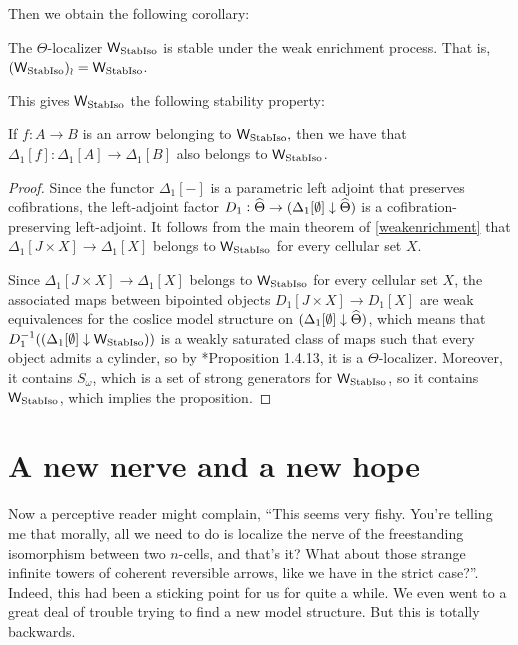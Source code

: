 Then we obtain the following corollary:
\begin{cor} The \(\Theta\)-localizer \(\mathsf{W}_{\operatorname{StabIso}}\) is stable under the weak enrichment process.  That is, \((\mathsf{W}_{\operatorname{StabIso}})_\wr=\mathsf{W}_{\operatorname{StabIso}}\).
\end{cor}
This gives \(\mathsf{W}_{\operatorname{StabIso}}\) the following stability property:
\begin{prop}If \(f:A\to B\) is an arrow belonging to \(\mathsf{W}_{\operatorname{StabIso}},\) then we have that \(\Delta_1[f]:\Delta_1[A]\to \Delta_1[B]\) also belongs to \(\mathsf{W}_{\operatorname{StabIso}}\).  
\end{prop}
\begin{proof}Since the functor \(\Delta_1[-]\) is a parametric left adjoint that preserves cofibrations, the left-adjoint factor \(D_1:\widehat{\Theta} \to {(\Delta_1[\emptyset]\downarrow \ensuremath{\widehat{\Theta}})}\) is a cofibration-preserving left-adjoint.  It follows from the main theorem of \eqref{weakenrichment} that \(\Delta_1[J\times X] \to \Delta_1[X]\) belongs to \(\mathsf{W}_{\operatorname{StabIso}}\) for every cellular set \(X\).

Since \(\Delta_1[J\times X]\to \Delta_1[X]\) belongs to \(\mathsf{W}_{\operatorname{StabIso}}\) for every cellular set \(X\), the associated maps between bipointed objects \(D_1[J\times X]\to D_1[X]\) are weak equivalences for the coslice model structure on \({(\Delta_1[\emptyset]\downarrow \widehat{\Theta})}\), which means that \(D_1^{-1}({(\Delta_1[\emptyset]\downarrow \mathsf{W}_{\operatorname{StabIso}})})\) is a weakly saturated class of maps such that every object admits a cylinder, so by \cite{cisinski-book}*{Proposition 1.4.13}, it is a \(\Theta\)-localizer.  Moreover, it contains \(S_\omega\), which is a set of strong generators for \(\mathsf{W}_{\operatorname{StabIso}}\), so it contains \(\mathsf{W}_{\operatorname{StabIso}}\), which implies the proposition.   
\end{proof}

\section{A new nerve and a new hope}
Now a perceptive reader might complain, ``This seems very fishy.  You're telling me that morally, all we need to do is localize the nerve of the freestanding isomorphism between two \(n\)-cells, and that's it? What about those strange infinite towers of coherent reversible arrows, like we have in the strict case?''.  Indeed, this had been a sticking point for us for quite a while.  We even went to a great deal of trouble trying to find a new model structure.  But this is totally backwards.

